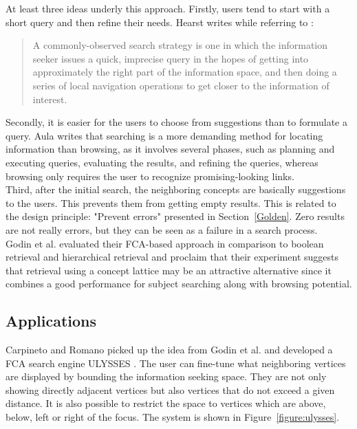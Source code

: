 \documentclass[11pt]{report}
\begin{document}
At least three ideas underly this approach. Firstly, users tend to start with a short query and then refine their needs. Hearst \cite{Hearst2009} writes while referring to \cite{Marchionini2006,Bates1990}:
\begin{quote}
	A commonly-observed search strategy is one in which the information seeker issues a quick, imprecise query in the hopes of getting into approximately the right part of the information space, and then doing a series of local navigation operations to get closer to the information of interest.
\end{quote}

Secondly, it is easier for the users to choose from suggestions than to formulate a query. Aula \cite{Aula2005} writes that searching is a more demanding method for locating information than browsing, as it involves several phases, such as planning and executing queries, evaluating the results, and refining the queries, whereas browsing only requires the user to recognize promising-looking links. \\

Third, after the initial search, the neighboring concepts are basically suggestions to the users. This prevents them from getting empty results. This is related to the design principle: "Prevent errors" presented in Section~\ref{Golden}. Zero results are not really errors, but they can be seen as a failure in a search process.\\

Godin et al. \cite{Godin1993} evaluated their FCA-based approach in comparison to boolean retrieval and hierarchical retrieval and proclaim that their experiment suggests that retrieval using a concept lattice may be an attractive alternative since it combines a good performance for subject searching along with browsing potential.

\subsection{Applications}
Carpineto and Romano picked up the idea from Godin et al. and developed a FCA search engine ULYSSES \cite{Carpineto1995,Carpineto1996}. The user can fine-tune what neighboring vertices are displayed by bounding the information seeking space. They are not only showing directly adjacent vertices but also vertices that do not exceed a given distance. It is also possible to restrict the space to vertices which are above, below, left or right of the focus. The system is shown in Figure~\ref{figure:ulysses}. \\
\end{document}
